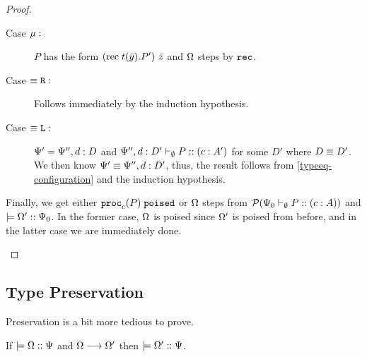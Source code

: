 \begin{proof}
\begin{itemize}
\begin{description}
      \item[Case $\mu :$] $P$ has the form ${(\mathrm{rec}\; {t}(\bar{y}) . {P}')}~{\bar{z}}$ and $\Omega$ steps by $\texttt{rec}$.

      \item[Case $\equiv\texttt{R} :$] Follows immediately by the induction hypothesis.
      \item[Case $\equiv\texttt{L} :$] $\Psi' = \Psi'', d : D$ and ${\Psi'', d : D'} \vdash_{\emptyset} P :: (c : A')$ for some $D'$ where $D \equiv D'$. We then know $\Psi' \equiv \Psi'', d : D'$, thus, the result follows from \cref{typeeq-configuration} and the induction hypothesis.
    \end{description}

    Finally, we get either $\mathtt{proc}_{c}(P)\;\mathtt{poised}$ or $\Omega$ steps from $\pred{\typeRecD {\ctx_0} \emptyset P c A}$ and $\models {\Omega'} :: {\Psi_0}$. In the former case, $\Omega$ is poised since $\Omega'$ is poised from before, and in the latter case we are immediately done.
\end{itemize}
\end{proof}

\subsection{Type Preservation}

Preservation is a bit more tedious to prove.

\begin{theorem}[Preservation]
\label{base:preservation}
If $\models {\Omega} :: {\Psi}$ and $\Omega \longrightarrow \Omega'$ then $\models {\Omega'} :: {\Psi}$.
\end{theorem}


